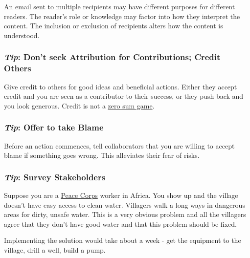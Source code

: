 
An email sent to multiple recipients may have different purposes for different readers. The reader's role or knowledge may factor into how they interpret the content. The inclusion or exclusion of recipients alters how the content is understood. 



\subsubsection*{\textit{Tip}: Don't seek Attribution for Contributions; Credit Others\label{sec:credit-others}}

Give credit to others for good ideas and beneficial actions. Either they accept credit and you are seen as a contributor to their success, or they push back and you look generous. Credit is not a \href{https://en.wikipedia.org/wiki/Zero-sum_game}{zero sum game}.

\subsubsection*{\textit{Tip}: Offer to take Blame\label{sec:take-blame}}

Before an action commences, tell collaborators that you are willing to accept blame if something goes wrong. This alleviates their fear of risks.

\subsubsection*{\textit{Tip}: Survey Stakeholders}

Suppose you are a \href{http://www.peacecorps.gov/}{Peace Corps} worker in Africa. You show up and the village doesn't have easy access to clean water. Villagers walk a long ways in dangerous areas for dirty, unsafe water. This is a very obvious problem and all the villagers agree that they don't have good water and that this problem should be fixed.

Implementing the solution would take about a week - get the equipment to the village, drill a well, build a pump.

